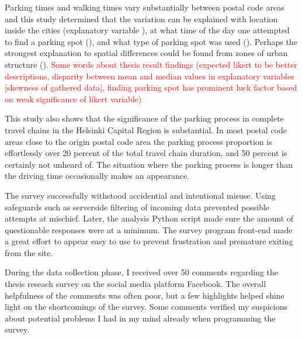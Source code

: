 Parking times and walking times vary substantially between postal code areas and this study determined that the variation can be explained with location inside the cities (explanatory variable ), at what time of the day one attempted to find a parking spot (), and what type of parking spot was used (). Perhaps the strongest explanation to spatial differences could be found from zones of urban structure (). 
\textcolor{red}{Some words about thesis result findings (expected likert to be better descriptions, disparity between mean and median values in explanatory variables [skewness of gathered data], finding parking spot has prominent luck factor based on weak significance of likert variable)}

This study also shows that the significance of the parking process in complete travel chains in the Helsinki Capital Region is substantial. In most postal code areas close to the origin postal code area the parking process proportion is effortlessly over 20 percent of the total travel chain duration, and 50 percent is certainly not unheard of. The situation where the parking process is longer than the driving time occasionally makes an appearance. 

The survey successfully withstood accidential and intentional misuse. Using safeguards such as serverside filtering of incoming data prevented possible attempts at mischief. Later, the analysis Python script made sure the amount of questionable responses were at a minimum. The survey program front-end made a great effort to appear easy to use to prevent frustration and premature exiting from the site.

During the data collection phase, I received over 50 comments regarding the thesis reseach survey on the social media platform Facebook. The overall helpfulness of the comments was often poor, but a few highlights helped shine light on the shortcomings of the survey. Some comments verified my suspicions about potential problems I had in my mind already when programming the survey.

